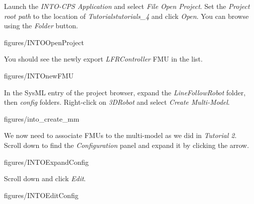 \documentclass[11pt,a4paper]{../tutorial}
\begin{document}
\begin{instructions}
\item Launch the \emph{INTO-CPS Application} and select \emph{File \menusep Open Project}. Set the \emph{Project root path} to the location of \emph{Tutorials\pathsep{}tutorials\_4} and click \emph{Open}. You can browse using the \emph{Folder} button.

    \begin{annotation}[width=0.35\linewidth,trim=0 0 0 0,clip]{figures/INTOOpenProject}
    \end{annotation}

    You should see the newly export \emph{LFRController} FMU in the list.

    \begin{annotation}[height=0.5\linewidth,trim=0 125 250 0,clip]{figures/INTOnewFMU}
    \end{annotation}

\item In the SysML entry of the project browser, expand the \emph{LineFollowRobot} folder, then \emph{config} folders. Right-click on \emph{3DRobot} and select \emph{Create Multi-Model}.

    \begin{annotation}[width=0.35\linewidth,trim=0 40 375 300,clip]{figures/into_create_mm}
    \end{annotation}

\newpage
\item We now need to associate FMUs to the multi-model as we did in \emph{Tutorial 2}. Scroll down to find the \emph{Configuration} panel and expand it by clicking the arrow.

    \begin{annotation}[width=0.85\linewidth,trim=0 0 0 250,clip]{figures/INTOExpandConfig}
    \end{annotation}

\item Scroll down and click \emph{Edit}.

    \begin{annotation}[width=0.85\linewidth,trim=0 0 0 260,clip]{figures/INTOEditConfig}
    \end{annotation}


\end{instructions}
\end{document}
